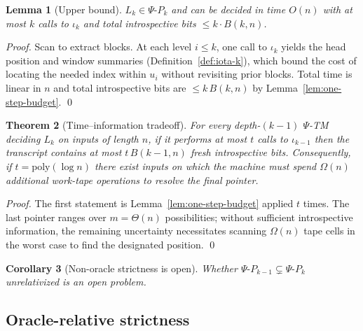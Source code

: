 \documentclass[11pt]{article}
\newtheorem{theorem}{Theorem}[section]
\newtheorem{lemma}[theorem]{Lemma}
\newtheorem{corollary}[theorem]{Corollary}
\theoremstyle{definition}
\newcommand{\PSi}{\Psi}
\newcommand{\PsiPk}{\PSi\text{-}P_k}
\begin{document}
\begin{lemma}[Upper bound]
\label{lem:Lk-upper}
$L_k\in \PsiPk$ and can be decided in time $O(n)$ with at most $k$ calls to $\iota_k$ and total introspective bits $\le k\cdot B(k,n)$.
\end{lemma}
\begin{proof}
Scan to extract blocks. At each level $i\le k$, one call to $\iota_k$ yields the head position and window summaries (Definition~\ref{def:iota-k}), which bound the cost of locating the needed index within $u_i$ without revisiting prior blocks. Total time is linear in $n$ and total introspective bits are $\le k\,B(k,n)$ by Lemma~\ref{lem:one-step-budget}. \qed
\end{proof}

\begin{theorem}[Time--information tradeoff]
\label{thm:tradeoff}
For every depth-$(k{-}1)$ $\PSi$-TM deciding $L_k$ on inputs of length $n$, if it performs at most $t$ calls to $\iota_{k-1}$ then the transcript contains at most $t\,B(k{-}1,n)$ fresh introspective bits. Consequently, if $t=\mathrm{poly}(\log n)$ there exist inputs on which the machine must spend $\Omega(n)$ additional work-tape operations to resolve the final pointer.
\end{theorem}
\begin{proof}
The first statement is Lemma~\ref{lem:one-step-budget} applied $t$ times. The last pointer ranges over $m=\Theta(n)$ possibilities; without sufficient introspective information, the remaining uncertainty necessitates scanning $\Omega(n)$ tape cells in the worst case to find the designated position. \qed
\end{proof}

\begin{corollary}[Non-oracle strictness is open]
\label{cor:strictness-open}
Whether $\Psi\text{-}P_{k-1}\subsetneq \Psi\text{-}P_k$ unrelativized is an open problem.
\end{corollary}

\subsection{Oracle-relative strictness}
\end{document}
